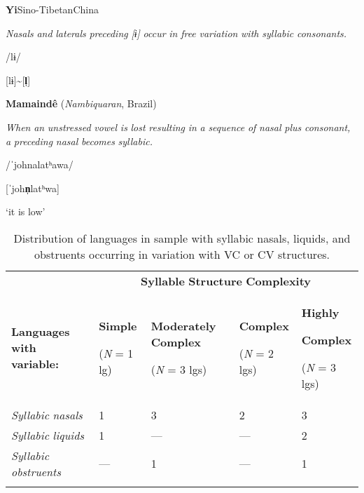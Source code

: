 \ea\label{ex:(3.17)}
 \textbf{Yi}{Sino-Tibetan}{China}

\textit{Nasals} \textit{and} \textit{laterals} \textit{preceding} \textit{[ɨ]} \textit{occur} \textit{in} \textit{free} \textit{variation} \textit{with} \textit{syllabic} \textit{consonants.}

/lɨ/

[lɨ]{\textasciitilde}[\textbf{l̩}]

\citep[31]{Gerner2013}

\z

\ea\label{ex:(3.18)}
   \textbf{Mamaindê} (\textit{Nambiquaran}, Brazil)

\textit{When} \textit{an} \textit{unstressed} \textit{vowel} \textit{is} \textit{lost} \textit{resulting} \textit{in} \textit{a} \textit{sequence} \textit{of} \textit{nasal} \textit{plus} \textit{consonant,} \textit{a} \textit{preceding} \textit{nasal} \textit{becomes} \textit{syllabic.}

/ˈjohnalatʰawa/

[ˈjoh\textbf{n̩}latʰwa]

\glt ‘it is low’

\citep[262-3]{Eberhard2009}

\z

\begin{table}
\begin{tabularx}{\textwidth}{XXXXX}
 & \multicolumn{4}{c}{ \textbf{Syllable} \textbf{Structure} \textbf{Complexity}}\\
\lsptoprule
 \textbf{Languages} \textbf{with} \textbf{variable:} & { \textbf{Simple}}

 (\textit{N} = 1 lg) & { \textbf{Moderately} \textbf{Complex}}

 (\textit{N} = 3 lgs) & { \textbf{Complex}}

 (\textit{N} = 2 lgs) & { \textbf{Highly} }

{ \textbf{Complex}}

 (\textit{N} = 3 lgs)\\
 \textit{Syllabic} \textit{nasals} & 1 & 3 & 2 & 3\\
 \textit{Syllabic} \textit{liquids} & 1 & — & — & 2\\
 \textit{Syllabic} \textit{obstruents} & — & 1 & — & 1\\
\lspbottomrule
\end{tabularx}
\caption{\label{3.7}Distribution of languages in sample with syllabic nasals, liquids, and obstruents occurring in variation with VC or CV structures.}
\end{table}

